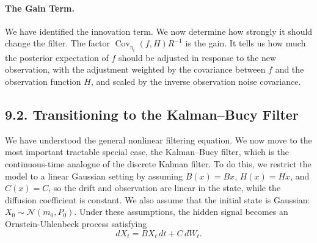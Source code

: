\documentclass[11pt]{article}
\theoremstyle{definition}
\theoremstyle{remark}
\begin{document}
\paragraph{The Gain Term.}
We have identified the innovation term. We now determine how strongly it should change the filter. The factor $\operatorname{Cov}_{\eta_t}(f,H)R^{-1}$ is the gain. It tells us how much the posterior expectation of $f$ should be adjusted in response to the new observation, with the adjustment weighted by the covariance between $f$ and the observation function $H$, and scaled by the inverse observation noise covariance.

\subsection*{9.2. Transitioning to the Kalman--Bucy Filter}
We have understood the general nonlinear filtering equation. We now move to the most important tractable special case, the Kalman--Bucy filter, which is the continuous-time analogue of the discrete Kalman filter. To do this, we restrict the model to a linear Gaussian setting by assuming $B(x)=Bx$, $H(x)=Hx$, and $C(x)=C$, so the drift and observation are linear in the state, while the diffusion coefficient is constant. We also assume that the initial state is Gaussian: $X_0\sim \mathcal N(m_0,P_0)$. Under these assumptions, the hidden signal becomes an Ornstein-Uhlenbeck process satisfying
\[
dX_t=BX_t\,dt+C\,dW_t.
\]
\end{document}
